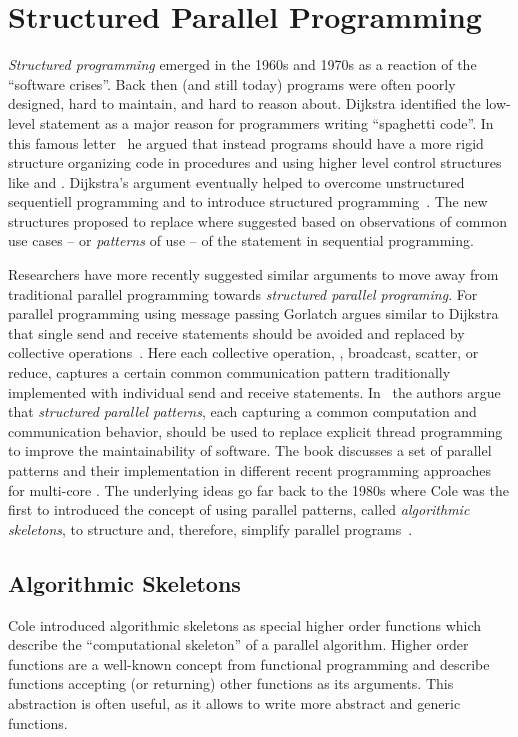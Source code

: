 \section{Structured Parallel Programming}
\emph{Structured programming} emerged in the 1960s and 1970s as a reaction of the ``software crises''.
Back then (and still today) programs were often poorly designed, hard to maintain, and hard to reason about.
Dijkstra identified the low-level  statement as a major reason for programmers writing ``spaghetti code''.
In this famous letter~\cite{} he argued that instead programs should have a more rigid structure organizing code in procedures and using higher level control structures like  and .
Dijkstra's argument eventually helped to overcome unstructured sequentiell programming and to introduce structured programming~\cite{}.
The new structures proposed to replace  where suggested based on observations of common use cases -- or \emph{patterns} of use -- of the  statement in sequential programming.

Researchers have more recently suggested similar arguments to move away from traditional parallel programming towards \emph{structured parallel programing}.
For parallel programming using message passing Gorlatch argues similar to Dijkstra that single send and receive statements should be avoided and replaced by collective operations~\cite{}.
Here each collective operation, \eg, broadcast, scatter, or reduce, captures a certain common communication pattern traditionally implemented with individual send and receive statements.
In~\cite{} the authors argue that \emph{structured parallel patterns}, each capturing a common computation and communication behavior, should be used to replace explicit thread programming to improve the maintainability of software.
The book discusses a set of parallel patterns and their implementation in different recent programming approaches for multi-core \CPUs.
The underlying ideas go far back to the 1980s where Cole was the first to introduced the concept of using parallel patterns, called \emph{algorithmic skeletons}, to structure and, therefore, simplify parallel programs~\cite{Cole1991}.

\subsection{Algorithmic Skeletons}
Cole introduced algorithmic skeletons as special higher order functions which describe the ``computational skeleton'' of a parallel algorithm.
Higher order functions are a well-known concept from functional programming and describe functions accepting (or returning) other functions as its arguments.
This abstraction is often useful, as it allows to write more abstract and generic functions.

